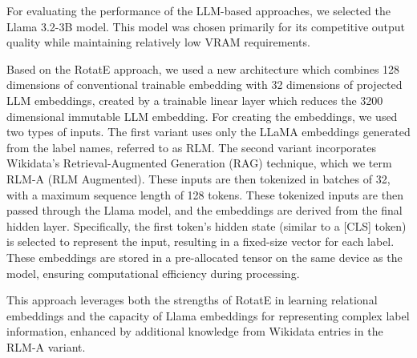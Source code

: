 For evaluating the performance of the LLM-based approaches, we selected the Llama 3.2-3B model.
This model was chosen primarily for its competitive output quality while maintaining relatively low VRAM requirements.

Based on the RotatE approach, we used a new architecture which combines 128 dimensions of conventional trainable embedding with 32 dimensions of projected LLM embeddings,
created by a trainable linear layer which reduces the 3200 dimensional immutable LLM embedding.
For creating the embeddings, we used two types of inputs.
The first variant uses only the LLaMA embeddings generated from the label names, referred to as RLM.
The second variant incorporates Wikidata’s Retrieval-Augmented Generation (RAG) technique, which we term RLM-A (RLM Augmented).
These inputs are then tokenized in batches of 32, with a maximum sequence length of 128 tokens.
These tokenized inputs are then passed through the Llama model, and the embeddings are derived from the final hidden layer.
Specifically, the first token’s hidden state (similar to a [CLS] token) is selected to represent the input, resulting in a fixed-size vector for each label.
These embeddings are stored in a pre-allocated tensor on the same device as the model, ensuring computational efficiency during processing.

This approach leverages both the strengths of RotatE in learning relational embeddings and the capacity of Llama embeddings for representing complex label information,
enhanced by additional knowledge from Wikidata entries in the RLM-A variant.